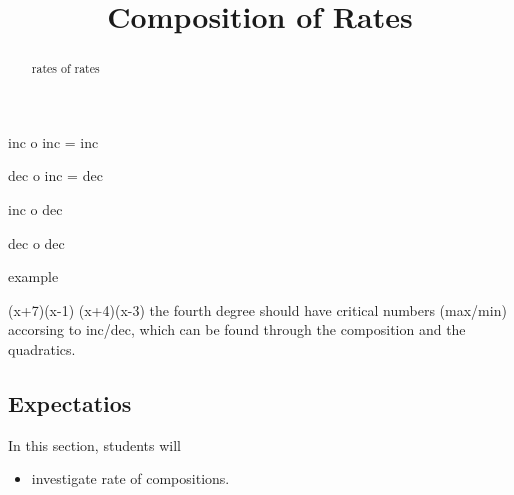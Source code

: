 \documentclass{ximera}
\title{Composition of Rates}
\begin{document}
\begin{abstract}
rates of rates
\end{abstract}
\maketitle



inc o inc = inc

dec o inc = dec

inc o dec 

dec o dec


example

(x+7)(x-1)
(x+4)(x-3)
the fourth degree should have critical numbers (max/min) accorsing to inc/dec, which can be found through the composition and the quadratics.





\subsection{Expectatios}


\begin{sectionOutcomes}
In this section, students will 

\begin{itemize}
\item investigate rate of compositions.

\end{itemize}
\end{sectionOutcomes}
\end{document}
